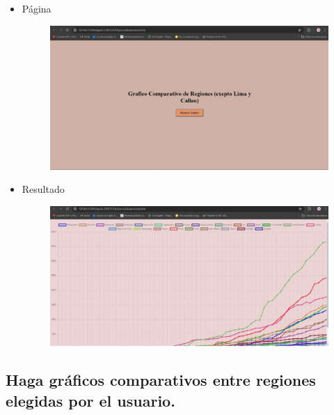 \documentclass{article}
\begin{document}
\begin{itemize}
\begin{figure}[H]
		\end{figure}
		\item Página
		\begin{figure}[H]
			\centering
			\includegraphics[width=1.0\textwidth,keepaspectratio]{img/Ejer6T2Pagina.jpg}
		\end{figure}
		\item Resultado
		\begin{figure}[H]
			\centering
			\includegraphics[width=1.0\textwidth,keepaspectratio]{img/Ejer6T2Result.jpg}
		\end{figure}
	\end{itemize}
	
	\subsection{Haga gráficos comparativos entre regiones elegidas por el usuario.}
	
\end{document}
